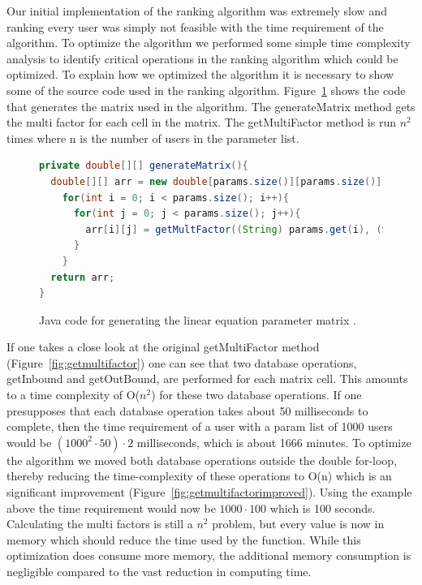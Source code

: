 Our initial implementation of the ranking algorithm was extremely slow and ranking every user was simply  not feasible with the time requirement of the algorithm. To optimize the algorithm we performed some simple time complexity analysis to identify critical operations in the ranking algorithm which could be optimized. To explain how we optimized the algorithm it is necessary to show some of the source code used in the ranking algorithm. Figure~\ref{fig:generateMatrix} shows the code that generates the matrix used in the algorithm. The generateMatrix method gets the multi factor for each cell in the matrix. The getMultiFactor method is run \(n^2\) times where n is the number of users in the parameter list.

\begin{figure}[h!]
\begin{lstlisting}[language=java]
private double[][] generateMatrix(){ 
  double[][] arr = new double[params.size()][params.size()]; 
    for(int i = 0; i < params.size(); i++){ 
      for(int j = 0; j < params.size(); j++){ 
        arr[i][j] = getMultFactor((String) params.get(i), (String) params.get(j));
      }
    } 
  return arr;
}
\end{lstlisting}
\caption{Java code for generating the linear equation parameter matrix \protect \cite{Goodrarzi2009}.}
\label{fig:generateMatrix}
\end{figure}

If one takes a close look at the original getMultiFactor method (Figure~\ref{fig:getmultifactor}) one can see that two database operations, getInbound and getOutBound, are performed for each matrix cell. This amounts to a time complexity of O(\( n^2\)) for these two database operations. If one presupposes that each database operation takes about 50 milliseconds to complete, then the time requirement of a user with a param list of 1000 users would be  \((1000^2 \cdot 50) \cdot 2\) milliseconds, which is about 1666 minutes. To optimize the algorithm we moved both database operations outside the double for-loop, thereby reducing the time-complexity of these operations to O(n) which is an significant improvement (Figure~\ref{fig:getmultifactorimproved}). Using the example above the time requirement would now be \(1000 \cdot 100\) which is 100 seconds. Calculating the multi factors is still a \(n^2\) problem, but every value is now in memory which should reduce the time used by the function. While this optimization does consume more memory, the additional memory consumption is negligible compared to the vast reduction in computing time.

